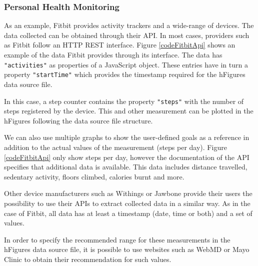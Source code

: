 \documentclass[twocolumn]{bmcart}%
\begin{document}
\subsubsection*{Personal Health Monitoring}

As an example, Fitbit provides activity trackers and a wide-range of devices. The data collected can be obtained through their API. In most cases, providers such as Fitbit follow an HTTP REST interface. Figure \ref{codeFitbitApi} shows an example of the data Fitbit provides through its interface. The data has \texttt{"activities"} as properties of a JavaScript object. These entries have in turn a property \texttt{"startTime"} which provides the timestamp required for the hFigures data source file.

In this case, a step counter contains the property \texttt{"steps"} with the number of steps registered by the device. This and other measurement can be plotted in the hFigures following the data source file structure.

We can also use multiple graphs to show the user-defined goals as a reference in addition to the actual values of the measurement (steps per day). Figure \ref{codeFitbitApi} only show steps per day, however the documentation of the API specifies that additional data is available. This data includes distance travelled, sedentary activity, floors climbed, calories burnt and more.

Other device manufacturers such as Withings or Jawbone provide their users the possibility to use their APIs to extract collected data in a similar way. As in the case of Fitbit, all data has at least a timestamp (date, time or both) and a set of values.

In order to specify the recommended range for these measurements in the hFigures data source file, it is possible to use websites such as WebMD or Mayo Clinic to obtain their recommendation for such values.

\end{document}
